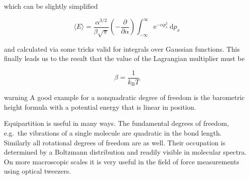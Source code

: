 \documentclass[letterpaper,10pt,english]{sphinxmanual}
\begin{document}
\sphinxAtStartPar
which can be slightly simplified

\sphinxAtStartPar
\begin{equation}
\langle E\rangle=\frac{\alpha^{3 / 2}}{\beta \sqrt{\pi}}\left(-\frac{\partial}{\partial \alpha}\right) \int_{-\infty}^{\infty} \mathrm{e}^{-\alpha p_{x}^{2}} \mathrm{~d} p_{x}
\end{equation}

\sphinxAtStartPar
and calculated via some tricks valid for integrals over Gaussian functions. This finally leads us to the result that the value of the Lagrangian multiplier must be

\sphinxAtStartPar
\begin{equation}
\beta=\frac{1}{k_{\mathrm{B}} T}
\end{equation}

\begin{sphinxadmonition}{warning}{}\unskip
\sphinxAtStartPar
A good example for a non\sphinxhyphen{}quadratic degree of freedom is the barometric height formula with a potential energy that is linear in position.
\end{sphinxadmonition}

\sphinxAtStartPar
Equipartition is useful in many ways. The fundamental degrees of freedom, e.g. the vibrations of a single molecule are quadratic in the bond length. Similarly all rotational degrees of freedom are as well. Their occupation is determined by a Boltzmann distribution and readily visible in molecular spectra. On more macroscopic scales it is very useful in the field of force measurements using optical tweezers.
\end{document}
